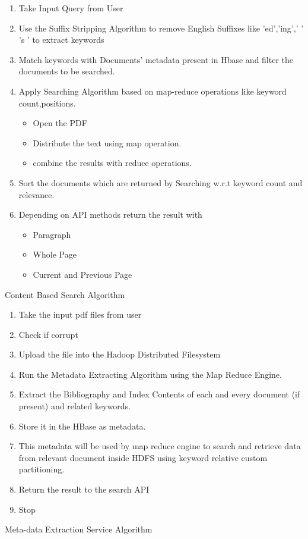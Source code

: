 \documentclass[oneside,a4paper,12pt]{report}
\begin{document}
{\begin{algorithm}[H]
\begin{enumerate}
\item Take Input Query from User
\item Use the Suffix Stripping Algorithm to remove English Suffixes like 'ed','ing',' ' 's ' to extract keywords
\item Match keywords with Documents' metadata present in Hbase and filter the documents to be searched.
\item Apply Searching Algorithm based on map-reduce operations like keyword count,positions.
\begin{itemize}
\item Open the PDF
\item Distribute the text using map operation.
\item combine the results with reduce operations.
\end{itemize} 
\item Sort the documents which are returned by Searching w.r.t keyword count and relevance.
\item Depending on API methods return the result with 
\begin{itemize}
\item Paragraph
\item Whole Page
\item Current and Previous Page
\end{itemize}
\end{enumerate}
\caption{Content Based Search Algorithm}
\end{algorithm}

\newpage

\begin{algorithm}[H]
\begin{enumerate}
\item Take the input pdf files from user
\item Check if corrupt
\item Upload the file into the Hadoop Distributed Filesystem
\item Run the Metadata Extracting Algorithm using the Map Reduce Engine.
\item Extract the Bibliography and Index Contents of each and every document (if present) and related keywords.
\item Store it in the HBase as metadata.
\item This metadata will be used by map reduce engine to search and retrieve data from relevant document inside HDFS using keyword relative custom partitioning.
\item Return the result to the search API
\item Stop
\end{enumerate}
 \caption{Meta-data Extraction Service Algorithm}
\end{algorithm}

}
\end{document}
